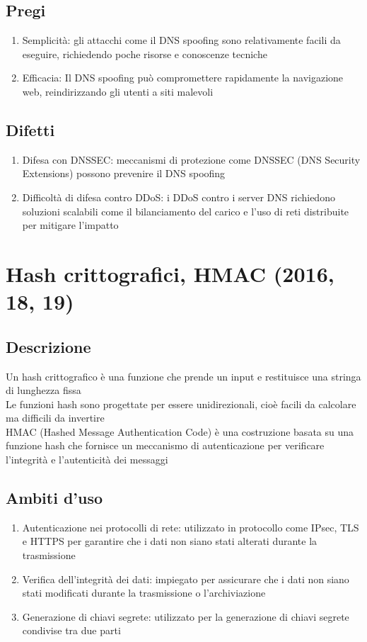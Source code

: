 \documentclass[10pt,oneside,a4paper]{article}
\begin{document}
\subsection{Pregi}
\begin{enumerate}
\item Semplicità: gli attacchi come il DNS spoofing sono relativamente facili da eseguire, richiedendo poche risorse e conoscenze tecniche
\item Efficacia: Il DNS spoofing può compromettere rapidamente la navigazione web, reindirizzando gli utenti a siti malevoli
\end{enumerate}
\subsection{Difetti}
\begin{enumerate}
\item Difesa con DNSSEC: meccanismi di protezione come DNSSEC (DNS Security Extensions) possono prevenire il DNS spoofing
\item Difficoltà di difesa contro DDoS: i DDoS contro i server DNS richiedono soluzioni scalabili come il bilanciamento del carico e l'uso di reti distribuite per mitigare l'impatto
\end{enumerate}
\section{Hash crittografici, HMAC (2016, 18, 19)}
\subsection{Descrizione}
Un hash crittografico è una funzione che prende un input e restituisce una stringa di lunghezza fissa\\
Le funzioni hash sono progettate per essere unidirezionali, cioè facili da calcolare ma difficili da invertire\\
HMAC (Hashed Message Authentication Code) è una costruzione basata su una funzione hash che fornisce un meccanismo di autenticazione per verificare l'integrità e l'autenticità dei messaggi
\subsection{Ambiti d'uso}
\begin{enumerate}
\item Autenticazione nei protocolli di rete: utilizzato in protocollo come IPsec, TLS e HTTPS per garantire che i dati non siano stati alterati durante la trasmissione
\item Verifica dell'integrità dei dati: impiegato per assicurare che i dati non siano stati modificati durante la trasmissione o l'archiviazione
\item Generazione di chiavi segrete: utilizzato per la generazione di chiavi segrete condivise tra due parti
\end{enumerate}
\end{document}
